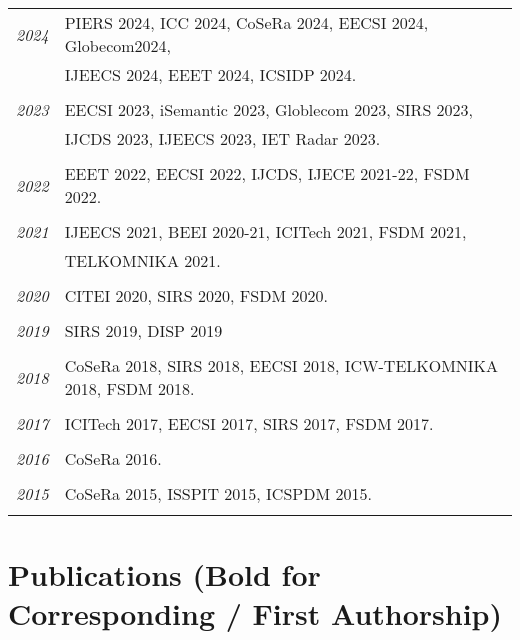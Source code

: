 \documentclass[paper=a4,fontsize=11pt]{scrartcl}
\begin{document}
\begin{longtable}{r|p{12cm}}
	\emph{2024} & PIERS 2024, ICC 2024, CoSeRa 2024, EECSI 2024, Globecom2024, \\
		& IJEECS 2024, EEET 2024, ICSIDP 2024. \\
	\multicolumn{2}{c}{} \\
	
	\emph{2023} & EECSI 2023, iSemantic 2023, Globlecom 2023, SIRS 2023, \\
		& IJCDS 2023, IJEECS 2023, IET Radar 2023. \\
	\multicolumn{2}{c}{} \\
	
	\emph{2022} & EEET 2022, EECSI 2022, IJCDS, IJECE 2021-22, FSDM 2022. \\
	\multicolumn{2}{c}{} \\
	
	\emph{2021} & IJEECS 2021, BEEI 2020-21, ICITech 2021, FSDM 2021, \\
		& TELKOMNIKA 2021. \\
	\multicolumn{2}{c}{} \\
	
	\emph{2020} & CITEI 2020, SIRS 2020, FSDM 2020. \\
	\multicolumn{2}{c}{} \\
	
	\emph{2019} & SIRS 2019, DISP 2019 \\
	\multicolumn{2}{c}{} \\
	
	\emph{2018} & CoSeRa 2018, SIRS 2018, EECSI 2018, ICW-TELKOMNIKA 2018, FSDM 2018.\\
	\multicolumn{2}{c}{} \\
	
	\emph{2017} & ICITech 2017, EECSI 2017, SIRS 2017, FSDM 2017.\\
	\multicolumn{2}{c}{} \\
	
	\emph{2016} & CoSeRa 2016.\\
	\multicolumn{2}{c}{} \\
	
	\emph{2015} & CoSeRa 2015, ISSPIT 2015, ICSPDM 2015.\\
	\multicolumn{2}{c}{}
\end{longtable}






\section*{Publications (Bold for Corresponding / First Authorship)}
\end{document}
